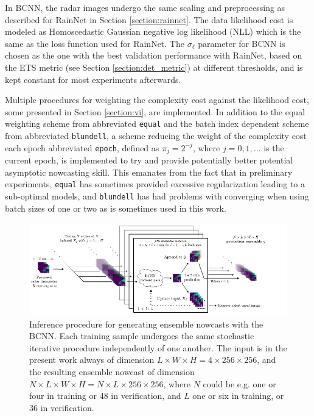 In BCNN, the radar images undergo the same scaling and preprocessing as described for RainNet in Section \ref{section:rainnet}. The data likelihood cost is modeled as Homoscedastic Gaussian negative log likelihood (NLL) which is the same as the loss function used for RainNet. The $\sigma_\ell$ parameter for BCNN is chosen as the one with the best validation performance with RainNet, based on the ETS metric (see Section \ref{section:det_metric}) at different thresholds, and is kept constant for most experiments afterwards. 

Multiple procedures for weighting the complexity cost against the likelihood cost, some presented in Section \ref{section:vi}, are implemented. In addition to the equal weighting scheme from \citet{graves_practical_2011} abbreviated \texttt{equal} and the batch index dependent scheme from \citet{blundell_weight_2015} abbreviated \texttt{blundell}, a scheme reducing the weight of the complexity cost each epoch abbreviated \texttt{epoch}, defined as $\pi_j = 2^{-j}$, where $j=0,1,\dots$ is the current epoch, is implemented to try and provide potentially better potential asymptotic nowcasting skill. This emanates from the fact that in preliminary experiments, \texttt{equal} has sometimes provided excessive regularization leading to a sub-optimal models, and \texttt{blundell} has had problems with converging when using batch sizes of one or two as is sometimes used in this work.



\begin{figure}[h]
	\begin{center}
		\includegraphics[scale=1]{images/inference_diagram/inference_diagram.pdf}
		\caption{Inference procedure for generating ensemble nowcasts with the BCNN. Each training sample undergoes the same stochastic iterative procedure independently of one another. The input is in the present work always of dimension $L \times W \times H = 4 \times 256 \times 256$, and the resulting ensemble nowcast of dimension $N \times L \times W \times H = N \times L \times 256 \times 256$, where $N$ could be e.g. one or four in training or 48 in verification, and $L$ one or six in training, or 36 in verification.}
		\label{fig:inference}
	\end{center}
\end{figure}


